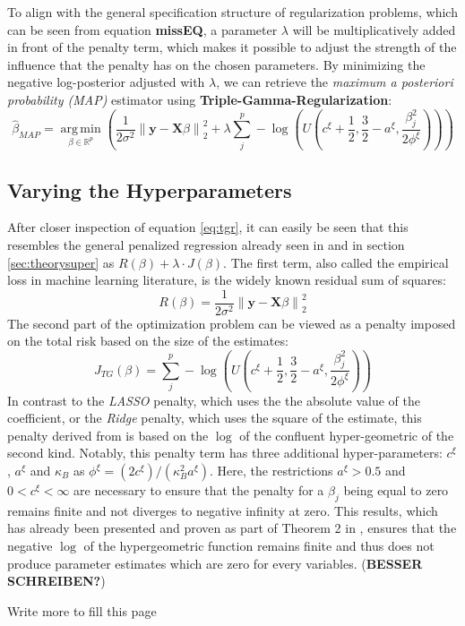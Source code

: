 \documentclass[12pt,a4paper]{article}
\newenvironment{lightbluebox}{%
    \begin{tcolorbox}[colback=lightblue, colframe=lightblue, fontupper=\itshape]%
}{%
    \end{tcolorbox}%
}
\newcommand{\norm}[1]{\left\lVert#1\right\rVert}
\DeclareMathOperator*{\argmin}{arg\,min}
\begin{document}
To align with the general specification structure of regularization problems, which can be seen from equation \textbf{missEQ}, a parameter $\lambda$ will be multiplicatively added in front of the penalty term, which makes it possible to adjust the strength of the influence that the penalty has on the chosen parameters. By minimizing the negative log-posterior adjusted with $\lambda$, we can retrieve the \textit{maximum a posteriori probability (MAP)} estimator using \textbf{Triple-Gamma-Regularization}:
\begin{equation}\label{eq:tgr}
\hat{\beta}_{MAP} = \underset{\beta \in \mathbb{R}^p}{\argmin} \left(\frac{1}{2\sigma^2}\norm{\mathbf{y} - \mathbf{X}\beta}_2^2 + \lambda \sum_j^p -\log\left(U\left(c^\xi + \frac{1}{2}, \frac{3}{2}-a^\xi, \frac{\beta_j^2}{2\phi^\xi}\right)\right)\right) 
\end{equation}

\newpage
\subsection{Varying the Hyperparameters}
After closer inspection of equation \ref{eq:tgr}, it can easily be seen that this resembles the general penalized regression already seen in \textcite{ESLpage398} and in section \ref{sec:theorysuper} as $R(\beta) + \lambda\cdot J(\beta)$. The first term, also called the empirical loss in machine learning literature, is the widely known residual sum of squares:
\[
R(\beta)=\frac{1}{2\sigma^2}\norm{\mathbf{y} - \mathbf{X}\beta}_2^2
\] 
The second part of the optimization problem can be viewed as a penalty imposed on the total risk based on the size of the estimates:
\[
J_{TG}(\beta) = \sum_j^p -\log\left(U\left(c^\xi + \frac{1}{2}, \frac{3}{2}-a^\xi, \frac{\beta_j^2}{2\phi^\xi}\right)\right)
\]
In contrast to the \textit{LASSO} penalty, which uses the the absolute value of the coefficient, or the \textit{Ridge} penalty, which uses the square of the estimate, this penalty derived from \textcite{TGP2020} is based on the $\log$ of the confluent hyper-geometric of the second kind. Notably, this penalty term has three additional hyper-parameters: $c^\xi$, $a^\xi$ and $\kappa_B$ as $\phi^\xi = (2c^\xi)/(\kappa^2_B a^\xi)$. Here, the restrictions $a^\xi>0.5$ and $0 < c^\xi < \infty$ are necessary to ensure that the penalty for a $\beta_j$ being equal to zero remains finite and not diverges to negative infinity at zero. This results, which has already been presented and proven as part of Theorem 2 in \textcite[5--6]{TGP2020}, ensures that the negative $\log$ of the hypergeometric function remains finite and thus does not produce parameter estimates which are zero for every variables. (\textbf{BESSER SCHREIBEN?})\\
\begin{lightbluebox}
Write more to fill this page
\end{lightbluebox}
\newpage
\end{document}
